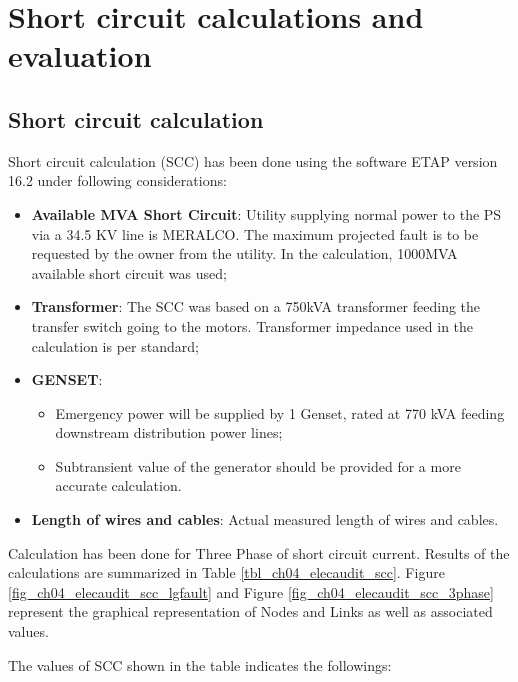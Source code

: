 \section{Short circuit calculations and evaluation} \label{ch04_elecaudit_shortcuircuitanalysis}
\subsection{Short circuit calculation}
Short circuit calculation (SCC) has been done using the software ETAP version 16.2 under following considerations:
\begin{itemize}
\item \textbf{Available MVA Short Circuit}: Utility supplying normal power to the PS  via a 34.5 KV line is MERALCO. The maximum projected fault is to be requested by the owner from the utility. In the calculation, 1000MVA available short circuit was used;

\item \textbf{Transformer}: The SCC was based on a  750kVA transformer  feeding the transfer switch going to the motors. Transformer impedance used in the calculation is per standard;

\item \textbf{GENSET}: 
\begin{itemize}
\item Emergency power will be supplied by 1 Genset, rated at 770 kVA feeding downstream distribution power lines;%

\item Subtransient value of the generator should be provided for a more  accurate calculation. 

\end{itemize}

\item \textbf{Length of wires and cables}: Actual measured length of wires and cables.

\end{itemize}

Calculation has been done for Three Phase of short circuit current. Results of the calculations are summarized in Table \ref{tbl_ch04_elecaudit_scc}. Figure \ref{fig_ch04_elecaudit_scc_lgfault} and Figure \ref{fig_ch04_elecaudit_scc_3phase} represent the graphical representation of Nodes and Links as well as associated values.



The values of SCC shown in the table indicates the followings:

